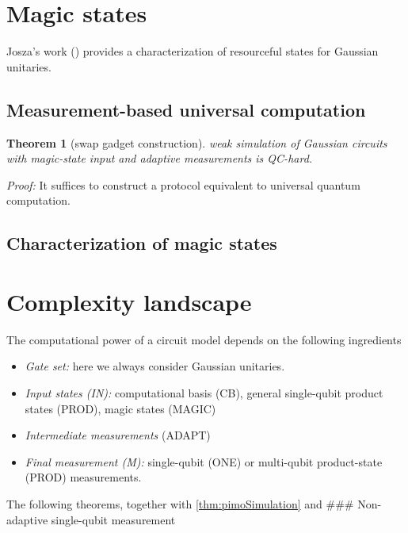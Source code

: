 \documentclass[
]{book}
\providecommand{\tightlist}{%
  \setlength{\itemsep}{0pt}\setlength{\parskip}{0pt}}
\newtheorem{theorem}{Theorem}[chapter]
\theoremstyle{definition}
\theoremstyle{definition}
\theoremstyle{definition}
\theoremstyle{definition}
\theoremstyle{remark}
\begin{document}
\section{Magic states}\label{magic-states}

Josza's work () provides a characterization of
resourceful states for Gaussian unitaries.

\subsection{Measurement-based universal computation}\label{measurement-based-universal-computation}

\begin{theorem}[swap gadget construction]
\protect\hypertarget{thm:qchardSimulation}{}\label{thm:qchardSimulation}weak simulation of Gaussian circuits with magic-state input and
adaptive measurements is QC-hard.
\end{theorem}

\emph{Proof:} It suffices to construct a protocol equivalent to universal
quantum computation.

\subsection{Characterization of magic states}\label{characterization-of-magic-states}

\section{Complexity landscape}\label{complexity-landscape}

The computational power of a circuit model depends on the following ingredients

\begin{itemize}
\tightlist
\item
  \emph{Gate set:} here we always consider Gaussian unitaries.
\item
  \emph{Input states (IN):} computational basis (CB), general single-qubit product states (PROD),
  magic states (MAGIC)
\item
  \emph{Intermediate measurements} (ADAPT)
\item
  \emph{Final measurement (M):} single-qubit (ONE) or multi-qubit product-state (PROD) measurements.
\end{itemize}

The following theorems, together with \ref{thm:pimoSimulation} and
\#\#\# Non-adaptive single-qubit measurement
\end{document}
